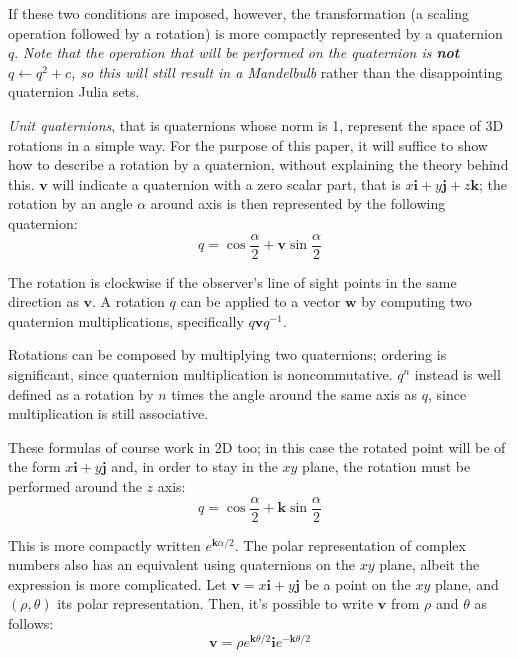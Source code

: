 \documentclass{article}
\let\vec\mathbf
\begin{document}
If these two conditions are imposed, however, the transformation (a
scaling operation followed by a rotation) is more compactly
represented by a quaternion $q$.  \emph{Note that the operation that
  will be performed on the quaternion is \textbf{not} $q\leftarrow
  q^2+c$, so this will still result in a Mandelbulb} rather than the
disappointing quaternion Julia sets.

\emph{Unit quaternions}, that is quaternions whose norm is 1, represent
the space of 3D rotations in a simple way.  For the purpose of this paper,
it will suffice to show how to describe a rotation by a quaternion,
without explaining the theory behind this.  $\vec{v}$ will indicate a
quaternion with a zero scalar part, that is $x\vec{i}+y\vec{j}+z\vec{k}$;
the rotation by an angle $\alpha$ around axis is then represented by the
following quaternion:
\begin{equation*}
q = \cos \frac\alpha2 + \vec{v} \sin \frac\alpha2
\end{equation*}

The rotation is clockwise if the observer's line of sight points in the
same direction as $\vec{v}$.  A rotation $q$ can be applied to a vector
$\vec{w}$ by computing two quaternion multiplications, specifically
$q\vec{v}q^{-1}$.

Rotations can be composed by multiplying two quaternions; ordering is
significant, since quaternion multiplication is noncommutative.  $q^n$
instead is well defined as a rotation by $n$ times the angle around the
same axis as $q$, since multiplication is still associative.

These formulas of course work in 2D too; in this case the rotated
point will be of the form $x\vec{i}+y\vec{j}$ and, in order to stay in
the $xy$ plane, the rotation must be performed around the $z$ axis:
\begin{equation*}
q = \cos \frac\alpha2 + \vec{k} \sin \frac\alpha2
\end{equation*}

\noindent
This is more compactly written $e^{\vec{k}\alpha/2}$.  The polar
representation of complex numbers also has an equivalent using quaternions
on the $xy$ plane, albeit the expression is more complicated.
Let $\vec{v}=x\vec{i}+y\vec{j}$ be a
point on the $xy$ plane, and $(\rho,\theta)$ its polar representation.
Then, it's possible to write $\vec{v}$ from $\rho$ and $\theta$ as follows:
\begin{equation*}
\vec{v}=\rho e^{\vec{k}\theta/2} \vec{i} e^{-\vec{k}\theta/2}
\end{equation*}
\end{document}
